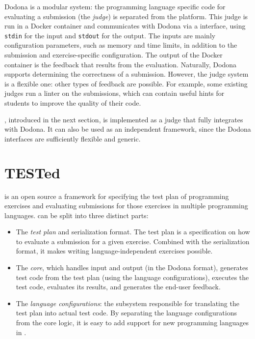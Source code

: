 \documentclass[5p,number]{elsarticle}
\begin{document}
    Dodona is a modular system: the programming language specific code for evaluating a submission (the \emph{judge}) is separated from the platform.
    This judge is run in a Docker container and communicates with Dodona via a  interface, using \texttt{stdin} for the input and \texttt{stdout} for the output.
    The inputs are mainly configuration parameters, such as memory and time limits, in addition to the submission and exercise-specific configuration.
    The output of the Docker container is the feedback that results from the evaluation.
    Naturally, Dodona supports determining the correctness of a submission.
    However, the judge system is a flexible one: other types of feedback are possible.
    For example, some existing judges run a linter on the submissions, which can contain useful hints for students to improve the quality of their code.
    
    \tested{}, introduced in the next section, is implemented as a judge that fully integrates with Dodona.
    It can also be used as an independent framework, since the Dodona  interfaces are sufficiently flexible and generic.

    \section{TESTed}\label{sec:extended-test}

    \tested{} is an open source a framework for specifying the test plan of programming exercises and evaluating submissions for those exercises in multiple programming languages.
    \tested{} can be split into three distinct parts:

    \begin{itemize}
        \item The \emph{test plan} and serialization format.
        The test plan is a specification on how to evaluate a submission for a given exercise.
        Combined with the serialization format, it makes writing language-independent exercises possible.
        \item The \emph{core}, which handles input and output (in the Dodona  format), generates test code from the test plan (using the language configurations), executes the test code, evaluates its results, and generates the end-user feedback.
        \item The \emph{language configurations}: the subsystem responsible for translating the test plan into actual test code.
        By separating the language configurations from the core logic, it is easy to add support for new programming languages in \tested{}.
    \end{itemize}
\end{document}
